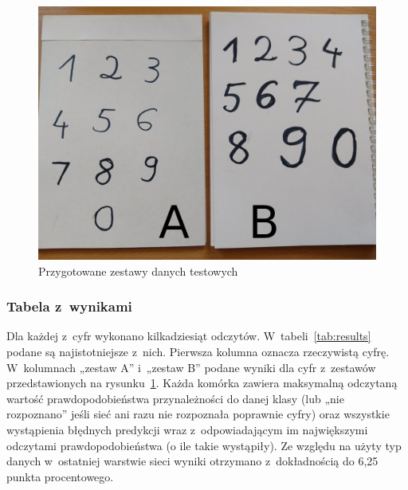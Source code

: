\documentclass[12pt, oneside, a4paper]{article}
\begin{document}
\begin{figure}[h]
  \centering
  \includegraphics[width=0.9\linewidth]{figures/test_data.jpg}
  \caption{Przygotowane zestawy danych testowych}\label{fig:test_data}
\end{figure}


\subsubsection{Tabela z~wynikami}\label{sec:Tabela z~wynikami}
Dla każdej z~cyfr wykonano kilkadziesiąt odczytów. W~tabeli~\ref{tab:results}
podane są najistotniejsze z~nich.
Pierwsza kolumna oznacza rzeczywistą cyfrę. W~kolumnach „zestaw A” i~„zestaw B”
podane wyniki dla cyfr z~zestawów przedstawionych
na rysunku~\ref{fig:test_data}.
Każda komórka zawiera maksymalną odczytaną wartość prawdopodobieństwa
przynależności do danej klasy (lub „nie rozpoznano” jeśli sieć ani razu
nie rozpoznała poprawnie cyfry)
oraz wszystkie wystąpienia błędnych predykcji wraz z~odpowiadającym im
największymi odczytami prawdopodobieństwa (o ile takie wystąpiły).
Ze względu na użyty typ danych w~ostatniej warstwie sieci
wyniki otrzymano z~dokładnością do 6,25 punkta procentowego.
\end{document}
